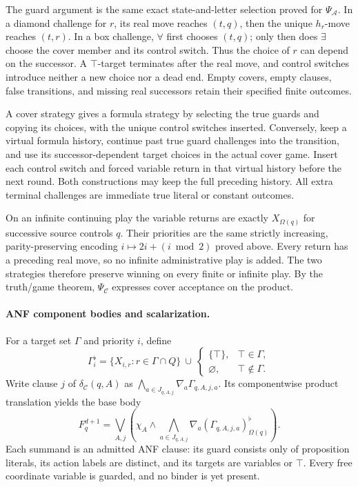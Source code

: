The guard argument is the
same exact state-and-letter
selection proved for
\(\Psi_{\mathcal A}\).
In a diamond challenge for
\(r\), its real move reaches
\((t,q)\), then the unique
\(h_r\)-move reaches \((t,r)\).
In a box challenge, \(\forall\)
first chooses \((t,q)\);
only then does \(\exists\)
choose the cover member
and its control switch.
Thus the choice of \(r\)
can depend on the successor.
A \(\top\)-target terminates
after the real move, and
control switches introduce
neither a new choice nor
a dead end.
Empty covers, empty clauses,
false transitions, and missing
real successors retain their
specified finite outcomes.

A cover strategy gives a
formula strategy by selecting
the true guards and copying
its choices, with the unique
control switches inserted.
Conversely, keep a virtual
formula history, continue past
true guard challenges into
the transition, and use its
successor-dependent target
choices in the actual cover
game. Insert each control
switch and forced variable
return in that virtual
history before the next round.
Both constructions may keep
the full preceding history.
All extra terminal challenges
are immediate true literal
or constant outcomes.

On an infinite continuing
play the variable returns
are exactly \(X_{\Omega(q)}\)
for successive source controls
\(q\). Their priorities are
the same strictly increasing,
parity-preserving encoding
\(i\mapsto2i+(i\bmod2)\)
proved above. Every return
has a preceding real move,
so no infinite administrative
play is added.
The two strategies therefore
preserve winning on every
finite or infinite play.
By the truth/game theorem,
\(\Psi_{\mathcal C}\) expresses
cover acceptance on the product.

\paragraph{ANF component bodies and scalarization.}
For a target set \(\Gamma\)
and priority \(i\), define
\[
 \Gamma_i^\flat
   =\{X_{i,r}:r\in\Gamma\cap Q\}
      \ \cup\
      \begin{cases}
        \{\top\},&\top\in\Gamma,\\
        \varnothing,&\top\notin\Gamma.
      \end{cases}
\]
Write clause \(j\) of
\(\delta_{\mathcal C}(q,A)\)
as
\(\bigwedge_{a\in J_{q,A,j}}
          \nabla_a\Gamma_{q,A,j,a}\).
Its componentwise product
translation yields the base
body
\[
 F_q^{d+1}=
 \bigvee_{A,j}
 \left(\chi_A\land
    \bigwedge_{a\in J_{q,A,j}}
      \nabla_a(\Gamma_{q,A,j,a})_{\Omega(q)}^\flat\right).
\]
Each summand is an admitted
ANF clause: its guard consists
only of proposition literals,
its action labels are distinct,
and its targets are variables
or \(\top\).
Every free coordinate variable
is guarded, and no binder is
yet present.

